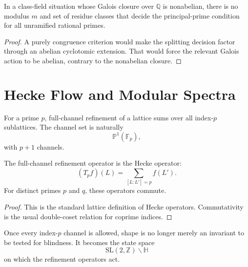 \begin{theorem}
\label{thm:innovation-input-modular-no-congruence-criterion}
In a class-field situation whose Galois closure over $\mathbb Q$ is
nonabelian, there is no modulus $m$ and set of residue classes that decide
the principal-prime condition for all unramified rational primes.
\end{theorem}

\begin{proof}
A purely congruence criterion would make the splitting decision factor
through an abelian cyclotomic extension. That would force the relevant
Galois action to be abelian, contrary to the nonabelian closure.
\end{proof}

\section{Hecke Flow and Modular Spectra}
\label{sec:innovation-input-modular-hecke-flow}

\begin{definition}
\label{def:innovation-input-modular-full-channel-refinement}
For a prime $p$, full-channel refinement of a lattice sums over all
index-$p$ sublattices. The channel set is naturally
$$
\mathbb P^1(\mathbb F_p),
$$
with $p+1$ channels.
\end{definition}

\begin{theorem}
\label{thm:innovation-input-modular-hecke-identity}
The full-channel refinement operator is the Hecke operator:
$$
(T_pf)(L)=\sum_{[L:L']=p}f(L').
$$
For distinct primes $p$ and $q$, these operators commute.
\end{theorem}

\begin{proof}
This is the standard lattice definition of Hecke operators. Commutativity
is the usual double-coset relation for coprime indices.
\end{proof}

\begin{principle}
\label{prin:innovation-input-modular-shape-state-space}
Once every index-$p$ channel is allowed, shape is no longer merely an
invariant to be tested for blindness. It becomes the state space
$$
\mathrm{SL}(2,\mathbb Z)\backslash\mathbb H
$$
on which the refinement operators act.
\end{principle}


